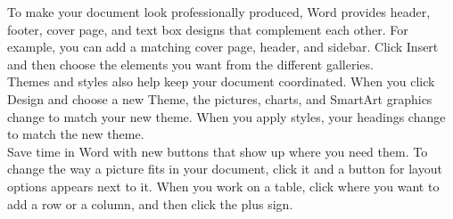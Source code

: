 \documentclass[a4paper, 11pt]{article}
\begin{document}
	To make your document look professionally produced, Word provides header, footer, cover page, and text box designs that complement each other. For example, you can add a matching cover page, header, and sidebar. Click Insert and then choose the elements you want from the different galleries.\\	
	
	Themes and styles also help keep your document coordinated. When you click Design and choose a new Theme, the pictures, charts, and SmartArt graphics change to match your new theme. When you apply styles, your headings change to match the new theme.\\	
	
	Save time in Word with new buttons that show up where you need them. To change the way a picture fits in your document, click it and a button for layout options appears next to it. When you work on a table, click where you want to add a row or a column, and then click the plus sign.\\
	
\end{document}
